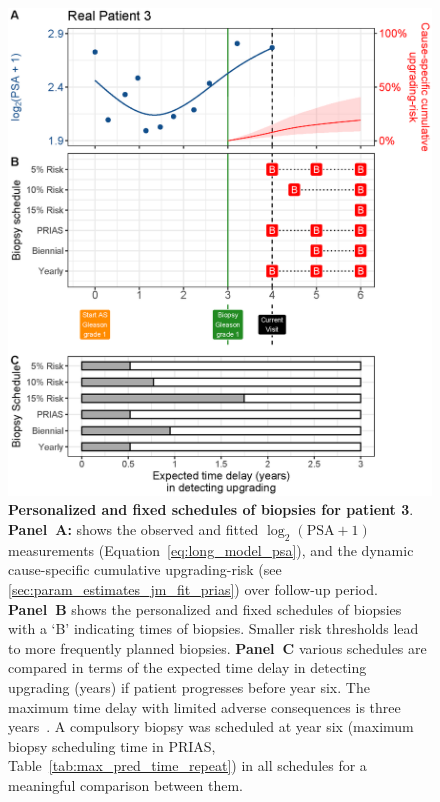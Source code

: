 \begin{figure}
\centerline{\includegraphics[width=\columnwidth]{images/demo_pat3_supp.eps}}
\caption{\textbf{Personalized and fixed schedules of biopsies for patient 3}. \textbf{Panel~A:} shows the observed and fitted $\log_2(\mbox{PSA} + 1)$ measurements (Equation~\ref{eq:long_model_psa}), and the dynamic cause-specific cumulative upgrading-risk (see \ref{sec:param_estimates_jm_fit_prias}) over follow-up period. \textbf{Panel~B} shows the personalized and fixed schedules of biopsies with a `B' indicating times of biopsies. Smaller risk thresholds lead to more frequently planned biopsies. \textbf{Panel~C} various schedules are compared in terms of the expected time delay in detecting upgrading (years) if patient progresses before year six. The maximum time delay with limited adverse consequences is three years~\citep{de2017estimating}. A compulsory biopsy was scheduled at year six (maximum biopsy scheduling time in PRIAS, Table~\ref{tab:max_pred_time_repeat}) in all schedules for a meaningful comparison between them.}
\label{fig:demo_pat3_supp}
\end{figure}